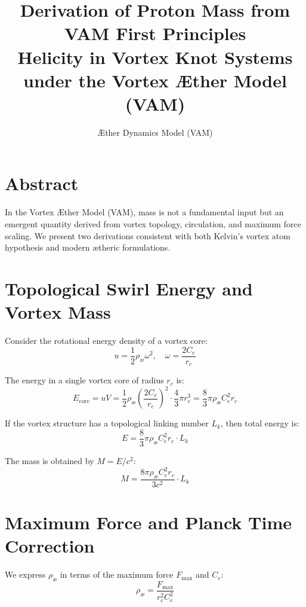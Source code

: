 \documentclass[12pt]{article}
\title{Derivation of Proton Mass from VAM First Principles \\
        Helicity in Vortex Knot Systems under the Vortex Æther Model (VAM)}
\author{Æther Dynamics Model (VAM)}
\date{}
\begin{document}
    \maketitle

    \section*{Abstract}
    In the Vortex Æther Model (VAM), mass is not a fundamental input but an emergent quantity derived from vortex topology, circulation, and maximum force scaling. We present two derivations consistent with both Kelvin's vortex atom hypothesis and modern ætheric formulations.

    \section{Topological Swirl Energy and Vortex Mass}
    Consider the rotational energy density of a vortex core:
    \begin{equation}
        u = \frac{1}{2} \rho_{\text{\ae}} \omega^2, \quad \omega = \frac{2C_e}{r_c}
    \end{equation}

    The energy in a single vortex core of radius $r_c$ is:
    \begin{equation}
        E_\text{core} = u V = \frac{1}{2} \rho_{\text{\ae}} \left( \frac{2C_e}{r_c} \right)^2 \cdot \frac{4}{3}\pi r_c^3 = \frac{8}{3} \pi \rho_{\text{\ae}} C_e^2 r_c
    \end{equation}

    If the vortex structure has a topological linking number $L_k$, then total energy is:
    \begin{equation}
        E = \frac{8}{3} \pi \rho_{\text{\ae}} C_e^2 r_c \cdot L_k
    \end{equation}

    The mass is obtained by $M = E/c^2$:
    \begin{equation}
        M = \frac{8\pi \rho_{\text{\ae}} C_e^2 r_c}{3 c^2} \cdot L_k
    \end{equation}

    \section{Maximum Force and Planck Time Correction}
    We express $\rho_{\text{\ae}}$ in terms of the maximum force $F_{\max}$ and $C_e$:
    \begin{equation}
        \rho_{\text{\ae}} = \frac{F_{\max}}{r_c^2 C_e^2}
    \end{equation}
\end{document}
